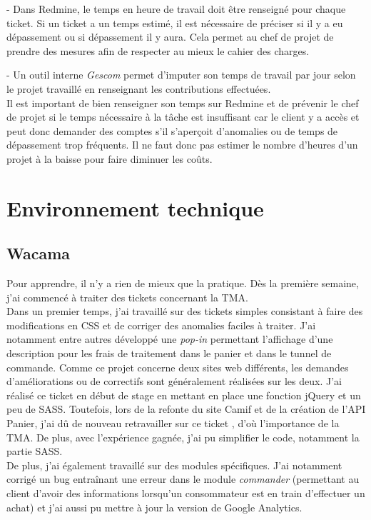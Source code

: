 \documentclass[12pt, a4paper, twoside]{report}
\begin{document}
- Dans Redmine, le temps en heure de travail doit être renseigné pour chaque ticket. Si un ticket a un temps estimé, il est nécessaire de préciser si il y a eu dépassement ou si dépassement il y aura. Cela permet au chef de projet de prendre des mesures afin de respecter au mieux le cahier des charges.

- Un outil interne \textit{Gescom} permet d'imputer son temps de travail par jour selon le projet travaillé en renseignant les contributions effectuées. \\

Il est important de bien renseigner son temps sur Redmine et de prévenir le chef de projet si le temps nécessaire à la tâche est insuffisant car le client y a accès et peut donc demander des comptes s'il s'aperçoit d'anomalies ou de temps de dépassement trop fréquents. Il ne faut donc pas estimer le nombre d'heures d'un projet à la baisse pour faire diminuer les coûts.


\section{Environnement technique}

\subsection{Wacama}

Pour apprendre, il n'y a rien de mieux que la pratique. Dès la première semaine, j'ai commencé à traiter des tickets concernant la TMA. \\

Dans un premier temps, j'ai travaillé sur des tickets simples consistant à faire des modifications en CSS et de corriger des anomalies faciles à traiter. J'ai notamment entre autres développé une \textit{pop-in} permettant l'affichage d'une description pour les frais de traitement dans le panier et dans le tunnel de commande. Comme ce projet concerne deux sites web différents, les demandes d'améliorations ou de correctifs sont généralement réalisées sur les deux. J'ai réalisé ce ticket en début de stage en mettant en place une fonction jQuery et un peu de SASS. Toutefois, lors de la refonte du site Camif et de la création de l'API Panier, j'ai dû de nouveau retravailler sur ce ticket , d'où l'importance de la TMA. De plus, avec l'expérience gagnée, j'ai pu simplifier le code, notamment la partie SASS. \\

De plus, j'ai également travaillé sur des modules spécifiques. J'ai notamment corrigé un bug entraînant une erreur dans le module \textit{commander} (permettant au client d'avoir des informations lorsqu'un consommateur est en train d'effectuer un achat) et j'ai aussi pu mettre à jour la version de Google Analytics.  \\
\end{document}
